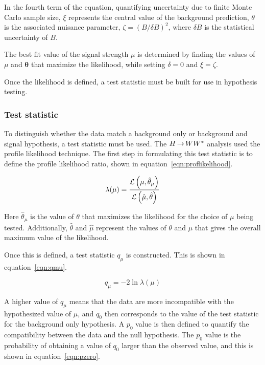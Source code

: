 In the fourth term of the equation, quantifying uncertainty due to finite Monte Carlo sample size, $\xi$ represents the central value of the background prediction, $\theta$ is the associated nuisance parameter, $\zeta = (B/\delta B)^2$, where $\delta B$ is the statistical uncertainty of $B$.

The best fit value of the signal strength $\mu$ is determined by finding the values of $\mu$ and $\boldsymbol{\theta}$ that maximize the likelihood, while setting $\delta = 0$ and $\xi = \zeta$.

Once the likelihood is defined, a test statistic must be built for use in hypothesis testing.

\subsubsection{Test statistic}

To distinguish whether the data match a background only or background and signal hypothesis, a test statistic must be used. The $H{\,{\rightarrow}\,}WW^\ast$ analysis used the profile likelihood technique\cite{Cowan:2010st}. The first step in formulating this test statistic is to define the profile likelihood ratio, shown in equation~\ref{eqn:proflikelihood}.

\begin{equation}
\lambda(\mu) = \frac{\mathcal{L}\left(\mu, \hat{\theta}_\mu\right)}{\mathcal{L}\left(\hat{\mu}, \hat{\theta}\right)}
\label{eqn:proflikelihood}
\end{equation}

Here $\hat{\theta}_\mu$ is the value of $\theta$ that maximizes the likelihood for the choice of $\mu$ being tested. Additionally, $\hat{\theta}$ and $\hat{\mu}$ represent the values of $\theta$ and $\mu$ that gives the overall maximum value of the likelihood. 

Once this is defined, a test statistic $q_\mu$ is constructed. This is shown in equation~\ref{eqn:qmu}.

\begin{equation}
q_\mu = -2 \ln \lambda(\mu)
\label{eqn:qmu}
\end{equation}

A higher value of $q_\mu$ means that the data are more incompatible with the hypothesized value of $\mu$, and $q_0$ then corresponds to the value of the test statistic for the background only hypothesis. A $p_0$ value is then defined to quantify the compatibility between the data and the null hypothesis. The $p_0$ value is the probability of obtaining a value of $q_0$ larger than the observed value, and this is shown in equation~\ref{eqn:pzero}.

